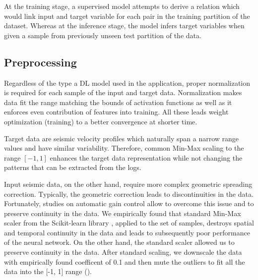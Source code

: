 \documentclass[paper,twocolomn]{geophysics}
\begin{document}
At the training stage, a supervised model attempts to derive a relation which would link input and target variable for each pair in the training partition of the dataset. Whereas at the inference stage, the model infers target variables when given a sample from previously unseen test partition of the data.

\subsection{Preprocessing}
Regardless of the type a DL model used in the application, proper normalization is required for each sample of the input and target data. Normalization makes data fit the range matching the bounds of activation functions as well as it enforces even contribution of features into training. All these leads weight optimization (training) to a better convergence at shorter time.


Target data are seismic velocity profiles which naturally span a narrow range values and have similar variability. Therefore, common Min-Max scaling to the range $[-1, 1]$ enhances the target data representation while not changing the patterns that can be extracted from the logs.  

Input seismic data, on the other hand, require more complex geometric spreading correction.  Typically, the geometric correction leads to discontinuities in the data. Fortunately, studies on automatic gain control allow to overcome this issue and to preserve continuity in the data. 
%
We empirically found that standard Min-Max scaler from the Scikit-learn library \citep{scikit-learn}, applied to the set of samples, destroys spatial and temporal continuity in the data and leads to subsequently poor performance of the neural network. On the other hand, the standard scaler allowed us to preserve continuity in the data. After standard scaling, we downscale the data with empirically found coefficent of 0.1 and then mute the outliers to fit all the data into the [-1, 1] range ().

\end{document}
